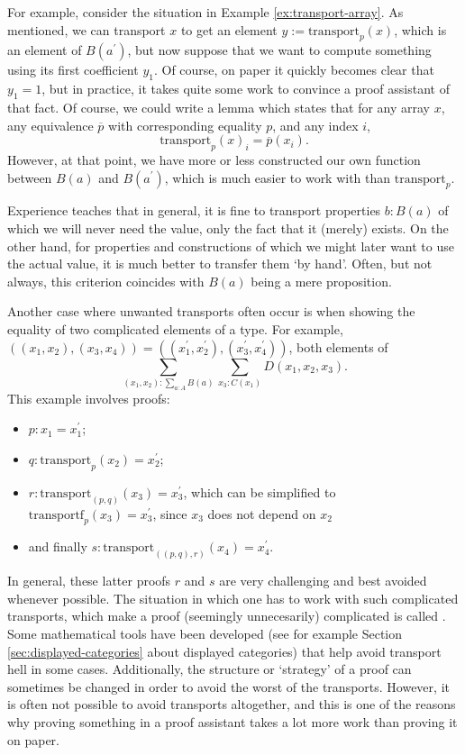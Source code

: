 For example, consider the situation in Example \ref{ex:transport-array}. As mentioned, we can transport $ x $ to get an element $ y := \mathrm{transport}_p(x) $, which is an element of $ B(a^\prime) $, but now suppose that we want to compute something using its first coefficient $ y_1 $. Of course, on paper it quickly becomes clear that $ y_1 = 1 $, but in practice, it takes quite some work to convince a proof assistant of that fact. Of course, we could write a lemma which states that for any array $ x $, any equivalence $ \overline p $ with corresponding equality $ p $, and any index $ i $,
\[ \mathrm{transport}_p(x)_i = \overline p(x_i). \]
However, at that point, we have more or less constructed our own function between $ B(a) $ and $ B(a^\prime) $, which is much easier to work with than $ \mathrm{transport}_p $.

Experience teaches that in general, it is fine to transport properties $ b: B(a) $ of which we will never need the value, only the fact that it (merely) exists. On the other hand, for properties and constructions of which we might later want to use the actual value, it is much better to transfer them `by hand'. Often, but not always, this criterion coincides with $ B(a) $ being a mere proposition.

Another case where unwanted transports often occur is when showing the equality of two complicated elements of a type. For example, $ ((x_1, x_2), (x_3, x_4)) = ((x^\prime_1, x^\prime_2), (x^\prime_3, x^\prime_4)) $, both elements of
\[ \sum_{(x_1, x_2): \sum_{a: A} B(a)} \sum_{x_3 : C(x_1)} D(x_1, x_2, x_3). \]
This example involves proofs:
\begin{itemize}
  \item $ p : x_1 = x^\prime_1 $;
  \item $ q : \mathrm{transport}_p(x_2) = x^\prime_2 $;
  \item $ r : \mathrm{transport}_{(p, q)}(x_3) = x^\prime_3 $, which can be simplified to $ \mathrm{transportf}_p(x_3) = x^\prime_3 $, since $ x_3 $ does not depend on $ x_2 $
  \item and finally $ s: \mathrm{transport}_{((p, q), r)}(x_4) = x^\prime_4 $.
\end{itemize}
In general, these latter proofs $ r $ and $ s $ are very challenging and best avoided whenever possible. The situation in which one has to work with such complicated transports, which make a proof (seemingly unnecesarily) complicated is called . Some mathematical tools have been developed (see for example Section \ref{sec:displayed-categories} about displayed categories) that help avoid transport hell in some cases. Additionally, the structure or `strategy' of a proof can sometimes be changed in order to avoid the worst of the transports. However, it is often not possible to avoid transports altogether, and this is one of the reasons why proving something in a proof assistant takes a lot more work than proving it on paper.
